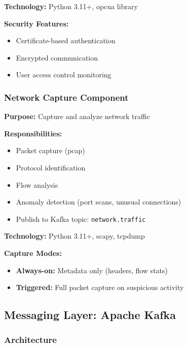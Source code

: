 \documentclass[12pt,a4paper]{article}
\begin{document}
\textbf{Technology:} Python 3.11+, opcua library

\textbf{Security Features:}
\begin{itemize}[leftmargin=1cm,itemsep=0pt]
    \item Certificate-based authentication
    \item Encrypted communication
    \item User access control monitoring
\end{itemize}

\subsubsection{Network Capture Component}

\textbf{Purpose:} Capture and analyze network traffic

\textbf{Responsibilities:}
\begin{itemize}[leftmargin=1cm,itemsep=0pt]
    \item Packet capture (pcap)
    \item Protocol identification
    \item Flow analysis
    \item Anomaly detection (port scans, unusual connections)
    \item Publish to Kafka topic: \texttt{network.traffic}
\end{itemize}

\textbf{Technology:} Python 3.11+, scapy, tcpdump

\textbf{Capture Modes:}
\begin{itemize}[leftmargin=1cm,itemsep=0pt]
    \item \textbf{Always-on:} Metadata only (headers, flow stats)
    \item \textbf{Triggered:} Full packet capture on suspicious activity
\end{itemize}

\subsection{Messaging Layer: Apache Kafka}

\subsubsection{Architecture}
\end{document}
